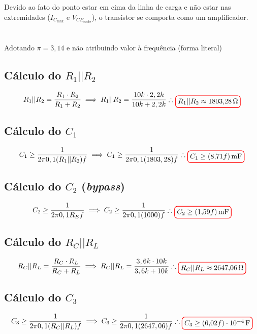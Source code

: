 \documentclass[12pt,openany,oneside,a4paper]{abntex2}
\begin{document}
Devido ao fato do ponto estar em cima da linha de carga e não estar nas extremidades ($I_{C_{\text{máx}}}$ e $V_{CE_{\text{corte}}}$), o transistor se comporta como um amplificador.

\section{}
Adotando $\pi = 3,14$ e não atribuindo valor à frequência (forma literal)

\subsection{Cálculo do $R_{1} || R_{2}$}
\[
R_{1} || R_{2} = \frac{R_{1} \cdot R_{2}}{R_{1} + R_{2}} \implies R_{1} || R_{2} = \frac{10k \cdot 2,2k}{10k + 2,2k} \therefore \tikz[baseline]{\node[draw=red, thick, rounded corners] {$R_{1} || R_{2} \approx 1803{,}28\,\Omega$};}
\]

\subsection{Cálculo do $C_{1}$}
\[
C_{1} \geq \frac{1}{2\pi0,1(R_{1} || R_{2})f} \implies C_{1} \geq \frac{1}{2\pi0,1(1803,28)f} \therefore \tikz[baseline]{\node[draw=red, thick, rounded corners] {$C_{1} \geq (8{,}71f)\,\text{mF}$};}
\]

\subsection{Cálculo do $C_{2}$ (\textit{bypass})}
\[
C_{2} \geq \frac{1}{2\pi0,1R_{E}f} \implies C_{2} \geq \frac{1}{2\pi0,1(1000)f} \therefore \tikz[baseline]{\node[draw=red, thick, rounded corners] {$C_{2} \geq (1{,}59f)\,\text{mF}$};}
\]

\subsection{Cálculo do $R_{C} || R_{L}$}
\[
R_{C} || R_{L} = \frac{R_{C} \cdot R_{L}}{R_{C} + R_{L}} \implies R_{C} || R_{L} = \frac{3,6k \cdot 10k}{3,6k + 10k} \therefore \tikz[baseline]{\node[draw=red, thick, rounded corners] {$R_{C} || R_{L} \approx 2647{,}06\,\Omega$};}
\]

\subsection{Cálculo do $C_{3}$}
\[
C_{3} \geq \frac{1}{2\pi0,1(R_{C} || R_{L})f} \implies C_{3} \geq \frac{1}{2\pi0,1(2647,06)f} \therefore \tikz[baseline]{\node[draw=red, thick, rounded corners] {$C_{3} \geq (6{,}02f)\cdot 10^{-4}\,\text{F}$};}
\]
\end{document}

